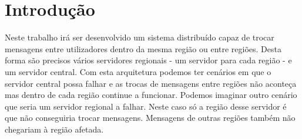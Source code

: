 \chapter{Introdução}
Neste trabalho irá ser desenvolvido um sistema distribuído capaz de trocar mensagens entre utilizadores dentro da mesma região ou entre regiões. Desta forma são precisos vários servidores regionais - um servidor para cada região - e um servidor central. Com esta arquitetura podemos ter cenários em que o servidor central possa falhar e as trocas de mensagens entre regiões não aconteça mas dentro de cada região continue a funcionar. Podemos imaginar outro cenário que seria um servidor regional a falhar. Neste caso só a região desse servidor é que não conseguiria trocar mensagens. Mensagens de outras regiões também não chegariam à região afetada.